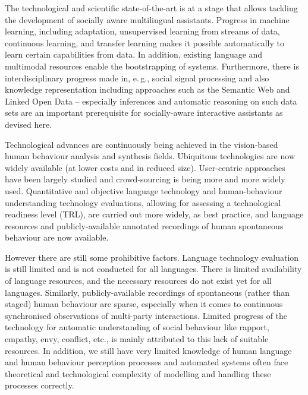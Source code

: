 \documentclass[10pt, plain]{../../metanetpaper}
\begin{document}
\begin{multicols}{2}
The technological and scientific state-of-the-art is at a stage that allows tackling the development of socially aware multilingual assistants. Progress in machine learning, including adaptation, unsupervised learning from streams of data, continuous learning, and transfer learning makes it possible automatically to learn certain capabilities from data. In addition, existing language and multimodal resources enable the bootstrapping of systems. Furthermore, there is interdisciplinary progress made in, e.\,g., social signal processing and also knowledge representation including approaches such as the Semantic Web and Linked Open Data -- especially inferences and automatic reasoning on such data sets are an important prerequisite for socially-aware interactive assistants as devised here.
 
Technological advances are continuously being achieved in the vision-based human behaviour analysis and synthesis fields. Ubiquitous technologies are now widely available (at lower costs and in reduced size). User-centric approaches have been largely studied and crowd-sourcing is being more and more widely used. Quantitative and objective language technology and human-behaviour understanding technology evaluations, allowing for assessing a technological readiness level (TRL), are carried out more widely, as best practice, and language resources and publicly-available annotated recordings of human spontaneous behaviour are now available.
 
However there are still some prohibitive factors. Language technology evaluation is still limited and is not conducted for all languages. There is limited availability of language resources, and the necessary resources do not exist yet for all languages. Similarly, publicly-available recordings of spontaneous (rather than staged) human behaviour are sparse, especially when it comes to continuous synchronised observations of multi-party interactions. Limited progress of the technology for automatic understanding of social behaviour like rapport, empathy, envy, conflict, etc., is mainly attributed to this lack of suitable resources. In addition, we still have very limited knowledge of human language and human behaviour perception processes and automated systems often face theoretical and technological complexity of modelling and handling these processes correctly.


\end{multicols}
\end{document}
